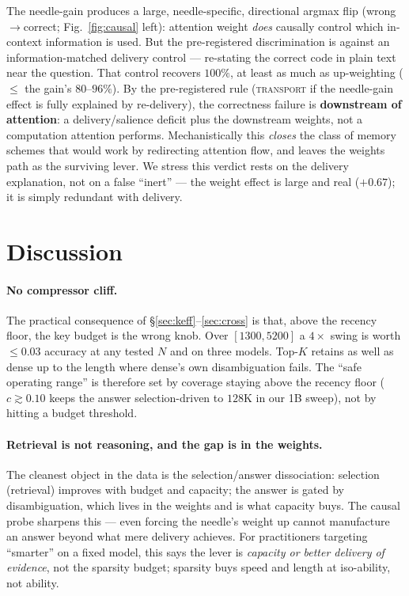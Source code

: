 \documentclass[11pt]{article}
\begin{document}
The needle-gain produces a large, needle-specific, directional argmax flip
(wrong$\to$correct; Fig.~\ref{fig:causal} left): attention weight \emph{does}
causally control which in-context information is used. But the pre-registered
discrimination is against an information-matched delivery control --- re-stating the
correct code in plain text near the question. That control recovers $100\%$, at least
as much as up-weighting ($\le$ the gain's $80$--$96\%$). By the pre-registered rule
(\textsc{transport} if the needle-gain effect is fully explained by re-delivery),
the correctness failure is \textbf{downstream of attention}: a delivery/salience
deficit plus the downstream weights, not a computation attention performs.
Mechanistically this \emph{closes} the class of memory schemes that would work by
redirecting attention flow, and leaves the weights path as the surviving lever. We
stress this verdict rests on the delivery explanation, not on a false ``inert'' ---
the weight effect is large and real ($+0.67$); it is simply redundant with delivery.

\section{Discussion}
\label{sec:discuss}

\paragraph{No compressor cliff.}
The practical consequence of \S\ref{sec:keff}--\ref{sec:cross} is that, above the
recency floor, the key budget is the wrong knob. Over $[1300,5200]$ a $4\times$ swing
is worth $\le 0.03$ accuracy at any tested $N$ and on three models. Top-$K$ retains
as well as dense up to the length where dense's own disambiguation fails. The ``safe
operating range'' is therefore set by coverage staying above the recency floor
($c\gtrsim 0.10$ keeps the answer selection-driven to $128\mathrm{K}$ in our 1B
sweep), not by hitting a budget threshold.

\paragraph{Retrieval is not reasoning, and the gap is in the weights.}
The cleanest object in the data is the selection/answer dissociation: selection
(retrieval) improves with budget and capacity; the answer is gated by
disambiguation, which lives in the weights and is what capacity buys. The causal
probe sharpens this --- even forcing the needle's weight up cannot manufacture an
answer beyond what mere delivery achieves. For practitioners targeting ``smarter''
on a fixed model, this says the lever is \emph{capacity or better delivery of
evidence}, not the sparsity budget; sparsity buys speed and length at iso-ability,
not ability.
\end{document}
